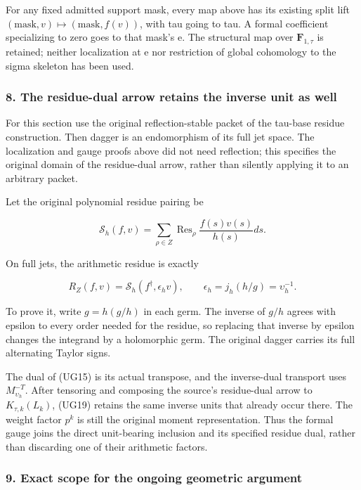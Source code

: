 For any fixed admitted support mask, every map above has its existing split lift \((\mathrm{mask},v)\mapsto(\mathrm{mask},f(v))\), with tau going to tau. A formal coefficient specializing to zero goes to that mask's e. The structural map over \(\mathbf F_{1,\tau}\) is retained; neither localization at e nor restriction of global cohomology to the sigma skeleton has been used.

\subsubsection{8. The residue-dual arrow retains the inverse unit as well}\label{endpoint-f1_unit_gauge--the-residue-dual-arrow-retains-the-inverse-unit-as-well}

For this section use the original reflection-stable packet of the tau-base residue construction. Then dagger is an endomorphism of its full jet space. The localization and gauge proofs above did not need reflection; this specifies the original domain of the residue-dual arrow, rather than silently applying it to an arbitrary packet.

Let the original polynomial residue pairing be

\[
\mathscr S_h(f,v)=\sum_{\rho\in Z}\operatorname{Res}_\rho
\frac{f(s)v(s)}{h(s)}ds.
\]

On full jets, the arithmetic residue is exactly

\[
\boxed{R_Z(f,v)=\mathscr S_h(f^\dagger,\epsilon_hv),
\qquad\epsilon_h=j_h(h/g)=\upsilon_h^{-1}.}
\tag{UG19}
\]

To prove it, write \(g=h(g/h)\) in each germ. The inverse of \(g/h\) agrees with epsilon to every order needed for the residue, so replacing that inverse by epsilon changes the integrand by a holomorphic germ. The original dagger carries its full alternating Taylor signs.

The dual of (UG15) is its actual transpose, and the inverse-dual transport uses \(M_{\upsilon_h}^{-T}\). After tensoring and composing the source's residue-dual arrow to \(K_{\tau,k}(L_k)\), (UG19) retains the same inverse units that already occur there. The weight factor \(p^k\) is still the original moment representation. Thus the formal gauge joins the direct unit-bearing inclusion and its specified residue dual, rather than discarding one of their arithmetic factors.

\subsubsection{9. Exact scope for the ongoing geometric argument}\label{endpoint-f1_unit_gauge--exact-scope-for-the-ongoing-geometric-argument}

